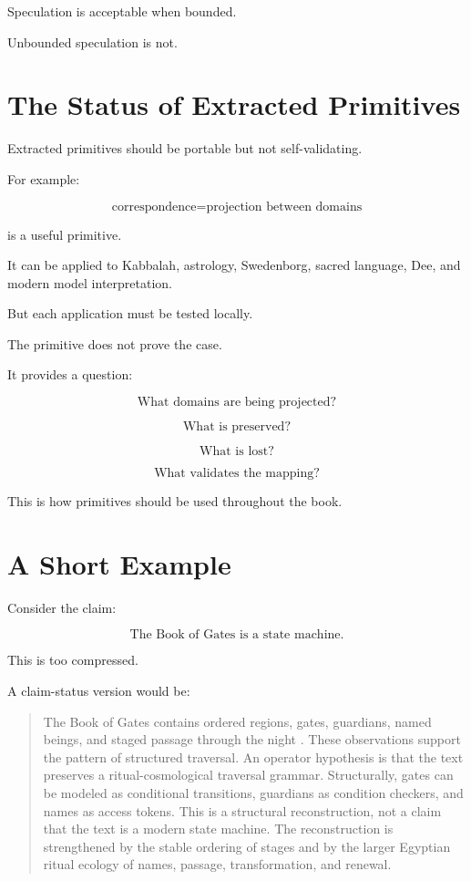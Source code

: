 \documentclass[11pt]{book}
\begin{document}
Speculation is acceptable when bounded.

Unbounded speculation is not.

\section{The Status of Extracted Primitives}

Extracted primitives should be portable but not self-validating.

For example:

\[
\text{correspondence} = \text{projection between domains}
\]

is a useful primitive.

It can be applied to Kabbalah, astrology, Swedenborg, sacred language, Dee, and modern model interpretation.

But each application must be tested locally.

The primitive does not prove the case.

It provides a question:

\[
\text{What domains are being projected?}
\]

\[
\text{What is preserved?}
\]

\[
\text{What is lost?}
\]

\[
\text{What validates the mapping?}
\]

This is how primitives should be used throughout the book.

\section{A Short Example}

Consider the claim:

\[
\text{The Book of Gates is a state machine.}
\]

This is too compressed.

A claim-status version would be:

\begin{quote}
The Book of Gates contains ordered regions, gates, guardians, named beings, and staged passage through the night \cite{Hornung1990BookGates,Hornung1999BooksAfterlife}. These observations support the pattern of structured traversal. An operator hypothesis is that the text preserves a ritual-cosmological traversal grammar. Structurally, gates can be modeled as conditional transitions, guardians as condition checkers, and names as access tokens. This is a structural reconstruction, not a claim that the text is a modern state machine. The reconstruction is strengthened by the stable ordering of stages and by the larger Egyptian ritual ecology of names, passage, transformation, and renewal.
\end{quote}
\end{document}
